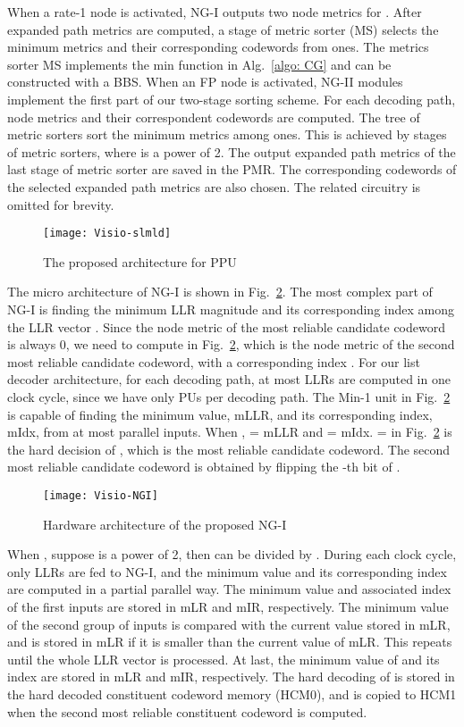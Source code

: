 \documentclass[journal]{IEEEtran}
\begin{document}
When a rate-1 node is activated, NG-I outputs two node metrics for . After  expanded path metrics are computed, a stage of metric sorter (MS) selects the  minimum metrics and their corresponding codewords from  ones. The metrics sorter MS implements the min function in Alg.~\ref{algo: CG} and can be constructed with a BBS. When an FP node is activated,  NG-II modules implement the first part of our two-stage sorting scheme. For each decoding path,  node metrics and their correspondent codewords are computed. The tree of metric sorters sort the  minimum metrics among  ones. This is achieved by  stages of metric sorters, where  is a power of 2. The output expanded path metrics of the last stage of metric sorter are saved in the PMR. The corresponding codewords of the selected  expanded path metrics are also chosen. The related circuitry is omitted for brevity.

\begin{figure} [hbt]
\centering
  \texttt{[image: Visio-slmld]}
  \caption{The proposed architecture for PPU}\label{fig: slmld}
\end{figure}


The micro architecture of NG-I is shown in Fig.~\ref{fig: ngi}. The most complex part of NG-I is finding the minimum LLR magnitude and its corresponding index among the LLR vector . Since the node metric of the most reliable candidate codeword is always 0, we need to compute  in Fig.~\ref{fig: ngi}, which is the node metric of the second most reliable candidate codeword, with a corresponding index . For our list decoder architecture, for each decoding path, at most  LLRs are computed in one clock cycle, since we have only  PUs per decoding path. The Min-1 unit in Fig.~\ref{fig: ngi} is capable of finding the minimum value, mLLR, and its corresponding index, mIdx, from at most  parallel inputs. When ,  = mLLR and  = mIdx.  =  in Fig.~\ref{fig: ngi} is the hard decision of , which is the most reliable candidate codeword. The second most reliable candidate codeword is obtained by flipping the -th bit of .

\begin{figure} [hbt]
  \centering
  \texttt{[image: Visio-NGI]}
  \caption{Hardware architecture of the proposed NG-I}\label{fig: ngi}
\end{figure}

When , suppose  is a power of 2, then  can be divided by . During each clock cycle, only  LLRs are fed to NG-I, and the minimum value and its corresponding index are computed in a partial parallel way. The minimum value and associated index of the first  inputs are stored in mLR and mIR, respectively. The minimum value of the second group of  inputs is compared with the current value stored in mLR, and is stored in mLR if it is smaller than the current value of mLR. This repeats until the whole LLR vector  is processed. At last, the minimum value of  and its index are stored in mLR and mIR, respectively. The hard decoding of  is stored in the hard decoded constituent codeword memory (HCM0), and is copied to HCM1 when the second most reliable constituent codeword is computed.
\end{document}
